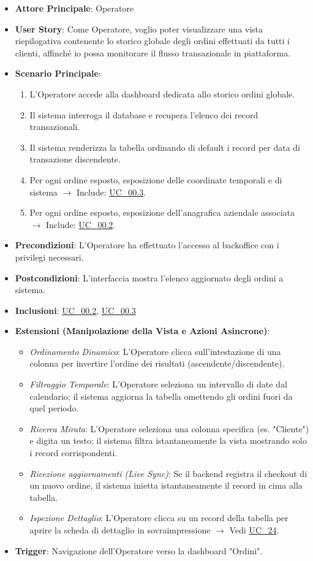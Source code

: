 \begin{itemize}
    \item \textbf{Attore Principale}: Operatore
    \item \textbf{User Story}: Come Operatore, voglio poter visualizzare una vista riepilogativa contenente lo storico globale degli ordini effettuati da tutti i clienti, affinché io possa monitorare il flusso transazionale in piattaforma.
    \item \textbf{Scenario Principale}: 
    \begin{enumerate}
        \item L'Operatore accede alla dashboard dedicata allo storico ordini globale.
        \item Il sistema interroga il database e recupera l'elenco dei record transazionali.
        \item Il sistema renderizza la tabella ordinando di default i record per data di transazione discendente.
        \item Per ogni ordine esposto, esposizione delle coordinate temporali e di sistema $\rightarrow$ Include: \hyperref[uc_00.3]{UC\_00.3}.
        \item Per ogni ordine esposto, esposizione dell'anagrafica aziendale associata $\rightarrow$ Include: \hyperref[uc_00.2]{UC\_00.2}.
    \end{enumerate}
    \item \textbf{Precondizioni}: L'Operatore ha effettuato l'accesso al backoffice con i privilegi necessari.
    \item \textbf{Postcondizioni}: L'interfaccia mostra l'elenco aggiornato degli ordini a sistema.
    \item \textbf{Inclusioni}: \hyperref[uc_00.2]{UC\_00.2}, \hyperref[uc_00.3]{UC\_00.3}
    \item \textbf{Estensioni (Manipolazione della Vista e Azioni Asincrone)}:
    \begin{itemize}
        \item \textit{Ordinamento Dinamico}: L'Operatore clicca sull'intestazione di una colonna per invertire l'ordine dei risultati (ascendente/discendente).
        \item \textit{Filtraggio Temporale}: L'Operatore seleziona un intervallo di date dal calendario; il sistema aggiorna la tabella omettendo gli ordini fuori da quel periodo.
        \item \textit{Ricerca Mirata}: L'Operatore seleziona una colonna specifica (es. "Cliente") e digita un testo; il sistema filtra istantaneamente la vista mostrando solo i record corrispondenti.
        \item \textit{Ricezione aggiornamenti (Live Sync)}: Se il backend registra il checkout di un nuovo ordine, il sistema inietta istantaneamente il record in cima alla tabella.
        \item \textit{Ispezione Dettaglio}: L'Operatore clicca su un record della tabella per aprire la scheda di dettaglio in sovraimpressione $\rightarrow$ Vedi \hyperref[uc_24]{UC\_24}.
    \end{itemize}
    \item \textbf{Trigger}: Navigazione dell'Operatore verso la dashboard "Ordini".
\end{itemize}

